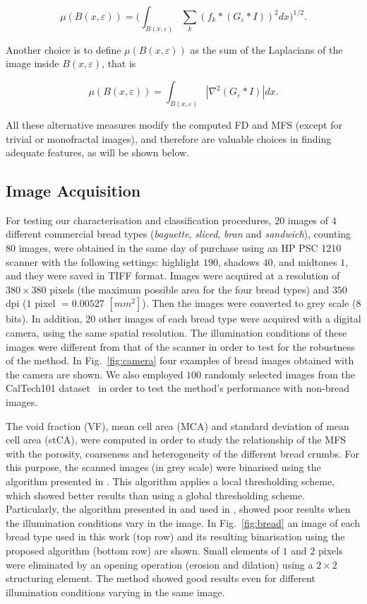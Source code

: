 \documentclass[twocolumn]{bmcart}%
\begin{document}
\begin{equation}
\mu(B(x,\varepsilon)) = (\int_{B(x,\varepsilon)}{\sum_{k}{(f_{k} \ast (G_{\varepsilon} \ast I))^{2}} dx)^{1/2}}.
\label{eqn:gradient}
\end{equation}

Another choice is to define $\mu(B(x, \varepsilon))$ as the sum of the Laplacians of the image inside $B(x, \varepsilon)$, that is

\begin{equation}
\mu(B(x,\varepsilon)) = \int_{B(x,\varepsilon)}|\nabla^2 (G_{\varepsilon} \ast I)| dx.
\label{eqn:laplacian}
\end{equation}

All these alternative measures modify the computed FD and MFS (except for trivial or monofractal images), and therefore are valuable choices in finding adequate features, as will be shown below.

\subsection{Image Acquisition}
\label{sec:7}
For testing our characterisation and classification procedures, $20$ images of $4$ different commercial bread types ({\em baguette}, {\em sliced}, {\em bran} and {\em sandwich}), counting $80$ images, were obtained in the same day of purchase using an HP PSC 1210 scanner with the following settings: highlight $190$, shadows $40$, and midtones $1$, and they were saved in TIFF format. Images were acquired at a resolution of $380 \times 380$ pixels (the maximum possible area for the four bread types) and $350$ dpi ($1$ pixel $= 0.00527$ $[mm^{2}]$). Then the images were converted to grey scale ($8$ bits). In addition, $20$ other images of each bread type were acquired with a digital camera, using the same spatial resolution. The illumination conditions of these images were different from that of the scanner in order to test for the robustness of the method. In Fig.~\ref{fig:camera} four examples of bread images obtained with the camera are shown. We also employed $100$ randomly selected images from the CalTech101 dataset~\cite{FeiFei04} in order to test the method's performance with non-bread images.

The void fraction (VF), mean cell area (MCA) and standard deviation of mean cell area (stCA), were computed in order to study the relationship of the MFS with the porosity, coarseness and heterogeneity of the different bread crumbs. For this purpose, the scanned images (in grey scale) were binarised using the algorithm presented in \cite{White83}. This algorithm applies a local thresholding scheme, which showed better results than using a global thresholding scheme. Particularly, the algorithm presented in \cite{Huang95} and used in \cite{Gonzales2008}, showed poor results when the illumination conditions vary in the image. In Fig.~\ref{fig:bread} an image of each bread type used in this work (top row) and its resulting binarisation using the proposed algorithm (bottom row) are shown. Small elements of $1$ and $2$ pixels were eliminated by an opening operation (erosion and dilation) using a $2\times2$ structuring element. The method showed good results even for different illumination conditions varying in the same image. 
\end{document}
